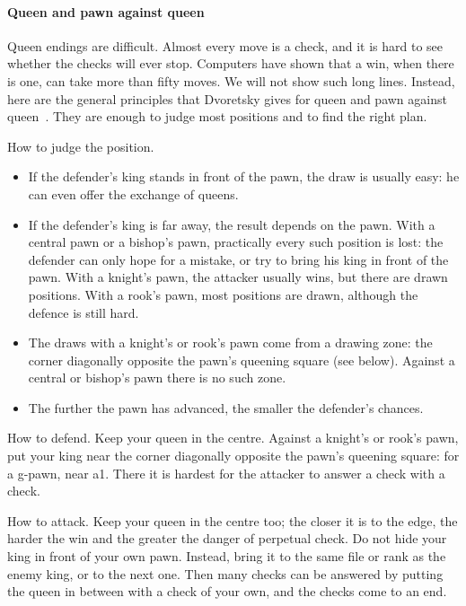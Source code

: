 
\paragraph{Queen and pawn against queen}\label{queen-and-pawn}
Queen endings are difficult. Almost every move is a check, and it is hard to see whether the checks
will ever stop. Computers have shown that a win, when there is one, can take more than fifty moves.
We will not show such long lines. Instead, here are the general principles that Dvoretsky gives
for queen and pawn against queen~\cite{Dvoretsky:2008-endgame-manual}. They are enough to judge
most positions and to find the right plan.

How to judge the position.
\begin{itemize}
\item If the defender's king stands in front of the pawn, the draw is usually easy: he can even
offer the exchange of queens.
\item If the defender's king is far away, the result depends on the pawn. With a central pawn or a
bishop's pawn, practically every such position is lost: the defender can only hope for a mistake,
or try to bring his king in front of the pawn. With a knight's pawn, the attacker usually wins,
but there are drawn positions. With a rook's pawn, most positions are drawn, although the defence
is still hard.
\item The draws with a knight's or rook's pawn come from a drawing zone: the corner
diagonally opposite the pawn's queening square (see below). Against a central or bishop's pawn
there is no such zone.
\item The further the pawn has advanced, the smaller the defender's chances.
\end{itemize}

How to defend. Keep your queen in the centre. Against a knight's or rook's pawn, put your
king near the corner diagonally opposite the pawn's queening square: for a g-pawn, near a1. There
it is hardest for the attacker to answer a check with a check.

How to attack. Keep your queen in the centre too; the closer it is to the edge, the harder
the win and the greater the danger of perpetual check. Do not hide your king in front of your own
pawn. Instead, bring it to the same file or rank as the enemy king, or to the next one. Then many
checks can be answered by putting the queen in between with a check of your own, and the checks
come to an end.
